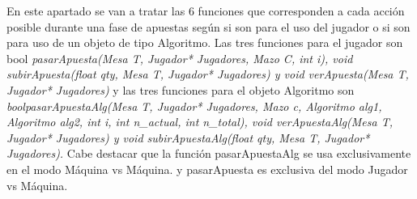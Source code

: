 En este apartado se van a tratar las 6 funciones que corresponden a cada acción posible durante una fase de apuestas según si son para el uso del jugador o si son para uso de un objeto de tipo Algoritmo. 
Las tres funciones para el jugador son bool \textit{pasarApuesta(Mesa T, Jugador* Jugadores, Mazo C, int i), void subirApuesta(float qty, Mesa T, Jugador* Jugadores) y void verApuesta(Mesa T, Jugador* Jugadores)} y las tres funciones para el objeto Algoritmo son \textit{boolpasarApuestaAlg(Mesa T, Jugador* Jugadores, Mazo c, Algoritmo alg1, Algoritmo alg2, int i, int n\_actual, int n\_total), void verApuestaAlg(Mesa T, Jugador* Jugadores) y void subirApuestaAlg(float qty, Mesa T, Jugador* Jugadores).}
Cabe destacar que la función pasarApuestaAlg se usa exclusivamente en el modo Máquina vs Máquina. y pasarApuesta es exclusiva del modo Jugador vs Máquina.

